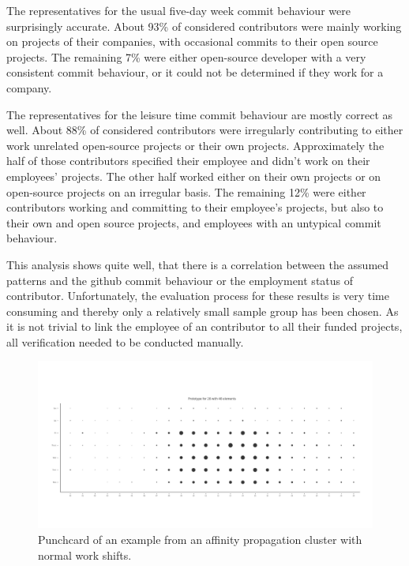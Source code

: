 The representatives for the usual five-day week commit behaviour were surprisingly accurate.
About 93\% of considered contributors were mainly working on projects of their companies, with occasional commits to their open source projects.
The remaining 7\% were either open-source developer with a very consistent commit behaviour, or it could not be determined if they work for a company.

The representatives for the leisure time commit behaviour are mostly correct as well.
About 88\% of considered contributors were irregularly contributing to either work unrelated open-source projects or their own projects.
Approximately the half of those contributors specified their employee and didn't work on their employees' projects.
The other half worked either on their own projects or on open-source projects on an irregular basis.
The remaining 12\% were either contributors working and committing to their employee's projects, but also to their own and open source projects, and employees with an untypical commit behaviour.

This analysis shows quite well, that there is a correlation between the assumed patterns and the github commit behaviour or the employment status of contributor.
Unfortunately, the evaluation process for these results is very time consuming and thereby only a relatively small sample group has been chosen.
As it is not trivial to link the employee of an contributor to all their funded projects, all verification needed to be conducted manually.

\begin{figure}[H]
    \includegraphics[scale=0.32]{./graphs/analysis-affinity/28}
    \centering
    \caption{Punchcard of an example from an affinity propagation cluster with normal work shifts.}\label{fig:random-sleep-rhythm}
\end{figure}


